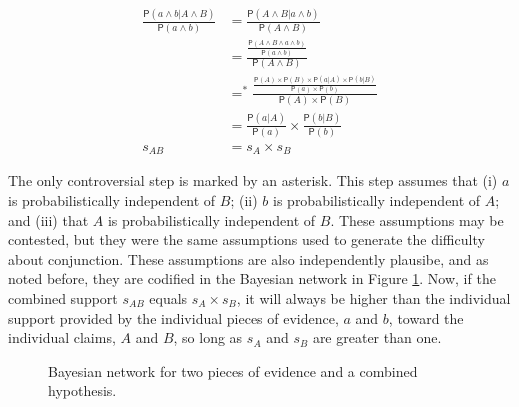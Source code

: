\documentclass[10pt,dvipsnames,enabledeprecatedfontcommands]{scrartcl}
\newcommand{\et}{\wedge}
\newcommand{\pr}[1]{\mathsf{P}(#1)}
\begin{document}
\begin{align*}
\frac{\pr{a \wedge b| A\wedge B}}{\pr{a \wedge b}} & =  \frac{\pr{A \et B| a\wedge b}}{\pr{A \et B}}\\
& =  \frac{\frac{\pr{A \et B \et a \wedge b}}{\pr{a \et b}}}{\pr{A \et B}} \\ 
& =^*  \frac{\frac{\pr{A} \times \pr{B} \times \pr{a | A} \times \pr{b | B}}{\pr{a} \times \pr{b}}}{\pr{A} \times \pr{B}} \\ 
& =  \frac{\pr{a |A}}{\pr{a}} \times \frac{\pr{b |B}}{\pr{b}} \\
s_{AB}& =  s_{A}\times s_{B} 
 \end{align*}

\noindent  The only controversial step is marked by an asterisk. This
step assumes that (i) \(a\) is probabilistically independent of \(B\);
(ii) \(b\) is probabilistically independent of \(A\); and (iii) that
\(A\) is probabilistically independent of \(B\). These assumptions may
be contested, but they were the same assumptions used to generate the
difficulty about conjunction. These assumptions are also independently
plausibe, and as noted before, they are codified in the Bayesian network
in Figure \ref{network-conjunction}.
 Now,
if the combined support \(s_{AB}\) equals \(s_{A}\times s_{B}\), it will
always be higher than the individual support provided by the individual
pieces of evidence, \(a\) and \(b\), toward the individual claims, \(A\)
and \(B\), so long as \(s_{A}\) and \(s_{B}\) are greater than one.

\begin{center}
\begin{figure}[h!]
\caption{Bayesian network for two pieces of evidence and a combined hypothesis.}
\label{network-conjunction}
\end{figure}
\end{center}
\end{document}
